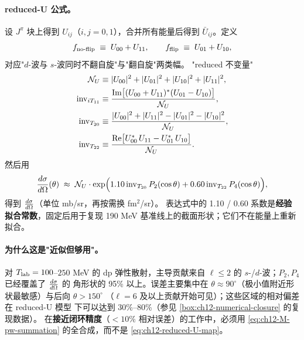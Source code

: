 \paragraph{reduced-U 公式。}
设 \(J^\pi\) 块上得到 \(U_{ij}\)（\(i,j=0,1\)），合并所有能量后得到
\(\bar U_{ij}\)。定义
\begin{equation}
\label{eq:ch12-uee-uflip}
f_{\rm no\text{-}flip} \;\equiv\; U_{00} + U_{11}, \qquad
f_{\rm flip}    \;\equiv\; U_{01} + U_{10},
\end{equation}
对应"\(d\)-波与 \(s\)-波同时不翻自旋"与"翻自旋"两类幅。
"reduced 不变量"
\begin{align}
\label{eq:ch12-reduced-U-norm}
\mathcal{N}_U &\equiv |U_{00}|^2 + |U_{01}|^2 + |U_{10}|^2 + |U_{11}|^2, \\
\label{eq:ch12-inv-it11}
\mathrm{inv}_{iT_{11}} &\equiv \frac{\operatorname{Im}\!\big[(U_{00}+U_{11})^* (U_{01} - U_{10})\big]}{\mathcal{N}_U}, \\
\label{eq:ch12-inv-t20}
\mathrm{inv}_{T_{20}}  &\equiv \frac{|U_{00}|^2 + |U_{11}|^2 - |U_{01}|^2 - |U_{10}|^2}{\mathcal{N}_U}, \\
\label{eq:ch12-inv-t22}
\mathrm{inv}_{T_{22}}  &\equiv \frac{\operatorname{Re}\!\big[U_{00}^*\,U_{11} - U_{01}^*\,U_{10}\big]}{\mathcal{N}_U}.
\end{align}
然后用
\begin{equation}
\label{eq:ch12-reduced-U-map}
\frac{d\sigma}{d\Omega}(\theta) \;\approx\;
\mathcal{N}_U \cdot \exp\!\Big(1.10\,\mathrm{inv}_{T_{20}}\,P_2(\cos\theta)
                            + 0.60\,\mathrm{inv}_{T_{22}}\,P_4(\cos\theta)\Big),
\end{equation}
得到 \(\frac{d\sigma}{d\Omega}\)（单位 mb/sr，再按需换 fm\(^2\)/sr）。
表达式中的 1.10 / 0.60 系数是\textbf{经验拟合常数}，固定后用于复现 190 MeV
基准线上的截面形状；它们不在能量上重新拟合。

\paragraph{为什么这是"近似但够用"。}
对 \({T_{\text{lab}}} = 100\)--\(250\) MeV 的 dp 弹性散射，主导贡献来自
\(\ell \leq 2\) 的 \(s\)-/\(d\)-波；\(P_2, P_4\) 已经覆盖了 \(\frac{d\sigma}{d\Omega}\) 的
角形状的 95\% 以上。误差主要集中在
\(\theta \approx 90^\circ\)（极小值附近形状最敏感）与后向 \(\theta > 150^\circ\)
（\(\ell = 6\) 及以上贡献开始可见）；这些区域的相对偏差在 reduced-U 模型
下可以达到 30\%--80\%（参见 \cref{box:ch12-numerical-closure} 的复现数据）。
在\textbf{接近闭环精度}（\(< 10\%\) 相对误差）的工作中，必须用
\cref{eq:ch12-M-pw-summation} 的全合成，而不是 \cref{eq:ch12-reduced-U-map}。

